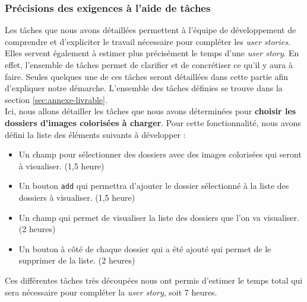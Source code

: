 \documentclass{article}
\begin{document}
\subsubsection{Précisions des exigences à l'aide de tâches}\label{sec:taches}

Les tâches que nous avons détaillées permettent à l'équipe de développement de comprendre et d'expliciter le travail nécessaire
pour compléter les \textit{user stories}. Elles servent également à estimer plus précisément le temps d'une \textit{user story}.
En effet, l'ensemble de tâches permet de clarifier et de concrétiser ce qu'il y aura à faire.
Seules quelques une de ces tâches seront détaillées dans cette partie afin d'expliquer notre démarche.
L'ensemble des tâches définies se trouve dans la section \ref{sec:annexe-livrable}.\\

Ici, nous allons détailler les tâches que nous avons déterminées pour \textbf{choisir les dossiers d'images colorisées à charger}.
Pour cette fonctionnalité, nous avons défini la liste des éléments suivants à développer :
\begin{itemize}
    \item Un champ pour sélectionner des dossiers avec des images colorisées qui seront à visualiser. (1,5 heure)
    \item Un bouton \texttt{add} qui permettra d'ajouter le dossier sélectionné à la liste des dossiers à visualiser. (1,5 heure)
    \item Un champ qui permet de visualiser la liste des dossiers que l'on va visualiser. (2 heures)
    \item Un bouton à côté de chaque dossier qui a été ajouté qui permet de le supprimer de la liste. (2 heures)
\end{itemize}
Ces différentes tâches très découpées nous ont permis d'estimer le temps total qui sera nécessaire pour compléter la \textit{user story}, soit 7 heures. \\
\end{document}
